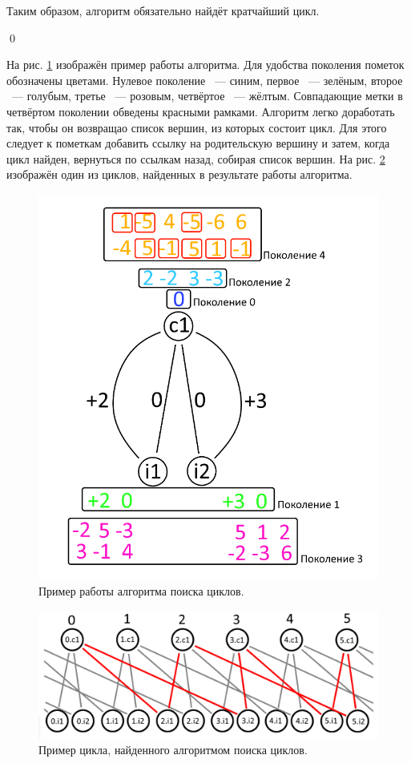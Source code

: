 \documentclass[14pt]{mmcs_article}
\begin{document}
Таким образом, алгоритм обязательно найдёт кратчайший цикл.

\qed

На рис. \ref{image:3} изображён пример работы алгоритма. Для удобства поколения пометок обозначены цветами. Нулевое поколение ~--- синим, первое ~--- зелёным, второе ~--- голубым, третье ~--- розовым, четвёртое ~--- жёлтым. Совпадающие метки в четвёртом поколении обведены красными рамками. Алгоритм легко доработать так, чтобы он возвращао список вершин, из которых состоит цикл. Для этого следует к пометкам добавить ссылку на родительскую вершину и затем, когда цикл найден, вернуться по ссылкам назад, собирая список вершин. На рис. \ref{image:4} изображён один из циклов, найденных в результате работы алгоритма. 

\begin{figure}[H]
  \centering
  \includegraphics[scale=0.4]{Fig_3.png}
  \caption{ Пример работы алгоритма поиска циклов. }
  \label{image:3}
\end{figure}

\begin{figure}[H]
  \centering
  \includegraphics[scale=0.4]{Fig_4.png}
  \caption{ Пример цикла, найденного алгоритмом поиска циклов. }
  \label{image:4}
\end{figure}
\end{document}
